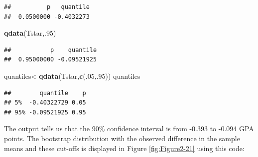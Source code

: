 \documentclass[]{book}
\newenvironment{Shaded}{\begin{snugshade}}{\end{snugshade}}
\newcommand{\KeywordTok}[1]{\textcolor[rgb]{0.13,0.29,0.53}{\textbf{{#1}}}}
\newcommand{\DataTypeTok}[1]{\textcolor[rgb]{0.13,0.29,0.53}{{#1}}}
\newcommand{\DecValTok}[1]{\textcolor[rgb]{0.00,0.00,0.81}{{#1}}}
\newcommand{\StringTok}[1]{\textcolor[rgb]{0.31,0.60,0.02}{{#1}}}
\newcommand{\NormalTok}[1]{{#1}}
\begin{document}
\begin{verbatim}
##          p   quantile 
##  0.0500000 -0.4032273
\end{verbatim}

\begin{Shaded}
\begin{Highlighting}[]
\KeywordTok{qdata}\NormalTok{(Tstar,.}\DecValTok{95}\NormalTok{)}
\end{Highlighting}
\end{Shaded}

\begin{verbatim}
##           p    quantile 
##  0.95000000 -0.09521925
\end{verbatim}

\begin{Shaded}
\begin{Highlighting}[]
\NormalTok{quantiles<-}\KeywordTok{qdata}\NormalTok{(Tstar,}\KeywordTok{c}\NormalTok{(.}\DecValTok{05}\NormalTok{,.}\DecValTok{95}\NormalTok{))}
\NormalTok{quantiles}
\end{Highlighting}
\end{Shaded}

\begin{verbatim}
##        quantile    p
## 5%  -0.40322729 0.05
## 95% -0.09521925 0.95
\end{verbatim}

The output tells us that the 90\% confidence interval is from -0.393 to
-0.094 GPA points. The bootstrap distribution with the observed
difference in the sample means and these cut-offs is displayed in Figure
\ref{fig:Figure2-21} using this code:






\begin{Shaded}
\end{Shaded}
\end{document}

